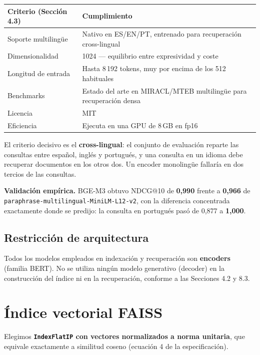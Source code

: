 \documentclass[10pt,a4paper]{article}
\begin{document}
\begin{center}\small
\begin{tabularx}{\textwidth}{@{}l X@{}}
\toprule
\textbf{Criterio (Sección 4.3)} & \textbf{Cumplimiento} \\
\midrule
Soporte multilingüe & Nativo en ES/EN/PT, entrenado para recuperación cross-lingual \\
Dimensionalidad & 1024 — equilibrio entre expresividad y coste \\
Longitud de entrada & Hasta 8\,192 tokens, muy por encima de los 512 habituales \\
Benchmarks & Estado del arte en MIRACL/MTEB multilingüe para recuperación densa \\
Licencia & MIT \\
Eficiencia & Ejecuta en una GPU de 8\,GB en fp16 \\
\bottomrule
\end{tabularx}
\end{center}

El criterio decisivo es el \textbf{cross-lingual}: el conjunto de evaluación reparte las consultas
entre español, inglés y portugués, y una consulta en un idioma debe recuperar documentos en los
otros dos. Un encoder monolingüe fallaría en dos tercios de las consultas.

\textbf{Validación empírica.} BGE-M3 obtuvo NDCG@10 de \textbf{0,990} frente a \textbf{0,966} de
\texttt{paraphrase-multi\-lingual-MiniLM-L12-v2}, con la diferencia concentrada exactamente donde
se predijo: la consulta en portugués pasó de 0,877 a \textbf{1,000}.

\subsection{Restricción de arquitectura}

Todos los modelos empleados en indexación y recuperación son \textbf{encoders} (familia BERT). No
se utiliza ningún modelo generativo (decoder) en la construcción del índice ni en la recuperación,
conforme a las Secciones 4.2 y 8.3.

\section{Índice vectorial FAISS}

Elegimos \textbf{\texttt{IndexFlatIP} con vectores normalizados a norma unitaria}, que equivale
exactamente a similitud coseno (ecuación 4 de la especificación).
\end{document}
